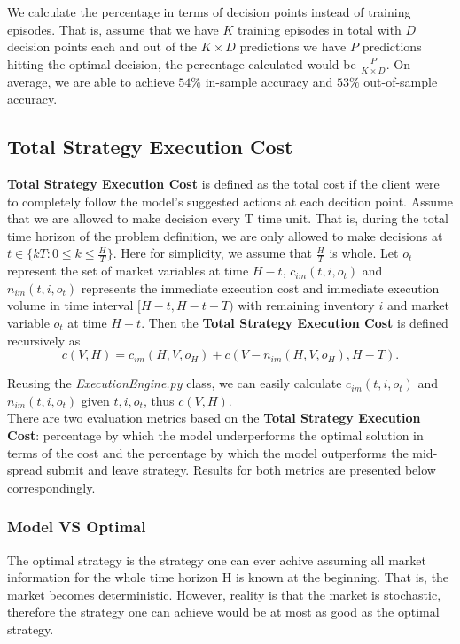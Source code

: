 \documentclass[12pt]{extarticle}
\begin{document}
\noindent We calculate the percentage in terms of decision points instead of training episodes. That is,
assume that we have $K$ training episodes in total with $D$ decision points each and
out of the $K \times D$ predictions we have $P$ predictions hitting the optimal decision,
the percentage calculated would be $\frac{P}{K \times D}$. On average, we are able to achieve
$54\%$ in-sample accuracy and $53\%$ out-of-sample accuracy.


\subsection{Total Strategy Execution Cost} \label{tsec}
\textbf{Total Strategy Execution Cost} is defined as the total cost if the client were to
completely follow the model's suggested actions at each decition point. Assume that
we are allowed to make decision every T time unit. That is, during the total time horizon
of the problem definition, we are only allowed to make decisions at $t \in \{ kT: 0 \le k \le \frac{H}{T} \}$.
Here for simplicity, we assume that $\frac{H}{T}$ is whole. Let $o_t$ represent the set
of market variables at time $H - t$, $c_{im}(t, i, o_t)$ and $n_{im}(t, i, o_t)$ represents the immediate execution cost and
immediate execution volume in time interval $[H-t, H-t+T)$ with remaining inventory $i$ and market variable $o_t$ at time $H - t$.
Then the \textbf{Total Strategy Execution Cost} is defined recursively as
$$c(V, H) = c_{im}(H, V, o_H) + c(V - n_{im}(H, V, o_H), H - T).$$

\noindent Reusing the \textit{ExecutionEngine.py} class, we can easily calculate
$c_{im}(t, i, o_t)$ and $n_{im}(t, i, o_t)$ given $t, i, o_t$, thus $c(V, H)$.\\


\noindent There are two evaluation metrics based on the \textbf{Total Strategy Execution Cost}:
percentage by which the model underperforms the optimal solution in terms of the cost and the
percentage by which the model outperforms the mid-spread submit and leave strategy.
Results for both metrics are presented below correspondingly.

\subsubsection{Model VS Optimal}
The optimal strategy is the strategy one can ever achive assuming all market information for the whole
time horizon H is known at the beginning. That is, the market becomes deterministic.
However, reality is that the market is stochastic, therefore the strategy one can
achieve would be at most as good as the optimal strategy.\\
\end{document}
